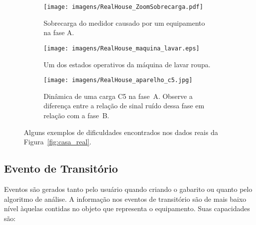 \begin{figure*}[p!]
  \begin{center}
    \begin{subfigure}[c]{\textwidth}
      \texttt{[image: imagens/RealHouse\_ZoomSobrecarga.pdf]}
      \caption{Sobrecarga do medidor causado por um equipamento na
        fase A.}
      \label{fig:sobrecarga}
    \end{subfigure}
    \hfill
    \begin{subfigure}[c]{\textwidth}
      \texttt{[image: imagens/RealHouse\_maquina\_lavar.eps]}
      \caption{Um dos estados operativos da máquina de lavar
        roupa.}
      \label{fig:maquina_lavar}
    \end{subfigure}
    \hfill
    \begin{subfigure}[c]{\textwidth}
      \texttt{[image: imagens/RealHouse\_aparelho\_c5.jpg]}
      \caption{Dinâmica de uma carga C5 na fase~A. Observe a diferença
entre a relação de sinal ruído dessa fase em relação com a fase~B.}
      \label{fig:c5_ruido}
    \end{subfigure}
  \end{center}
\caption[Alguns exemplos de dificuldades encontrados nos dados reais]{
Alguns exemplos de dificuldades encontrados nos dados reais da
Figura~\ref{fig:casa_real}.}
\label{fig:dificuldades}
\end{figure*}

%


\subsection{Evento de Transitório}
\label{ssec:evento}

Eventos são gerados tanto pelo usuário quando criando o gabarito ou
quanto pelo algoritmo de análise. A informação nos eventos de
transitório são de mais baixo nível àquelas contidas no objeto que
representa o equipamento. Suas capacidades são: 

